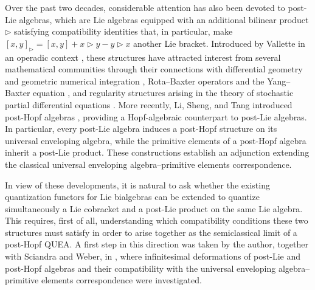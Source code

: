 \documentclass[11pt,english]{article}
\newcommand{\tri}{\mathbin{\triangleright}}
\theoremstyle{definition}
\begin{document}
Over the past two decades, considerable attention has also
been devoted to post-Lie algebras, which are Lie algebras
equipped with an additional bilinear product $\tri$ satisfying compatibility identities that, in particular,
make $[x,y]_{\tri}=[x,y]+x\tri y-y\tri x$
another Lie bracket.
Introduced by Vallette in an operadic context
\cite{Vallette}, these structures have attracted interest
from several mathematical communities through their
connections with differential geometry and geometric
numerical integration \cite{MuntheKaasLundervold},
Rota--Baxter operators and the Yang--Baxter equation
\cite{BaiGuoNi}, and regularity structures arising in
the theory of stochastic partial differential equations
\cite{BrunedKatsitsiadis}.
More recently, Li, Sheng, and Tang introduced post-Hopf
algebras \cite{LST}, providing a Hopf-algebraic counterpart
to post-Lie algebras. In particular, every post-Lie algebra
induces a post-Hopf structure on its universal enveloping
algebra, while the primitive elements of a post-Hopf algebra
inherit a post-Lie product. These constructions establish
an adjunction extending the classical universal enveloping
algebra--primitive elements correspondence.

In view of these developments, it is natural to ask whether
the existing quantization functors for Lie bialgebras can be
extended to quantize simultaneously a Lie cobracket and a
post-Lie product on the same Lie algebra. This requires,
first of all, understanding which compatibility conditions
these two structures must satisfy in order to arise together
as the semiclassical limit of a post-Hopf QUEA.
A first step in this direction was taken by the author,
together with Sciandra and Weber, in \cite{RSW}, where
infinitesimal deformations of post-Lie and post-Hopf algebras
and their compatibility with the universal enveloping
algebra--primitive elements correspondence were investigated.
\end{document}
